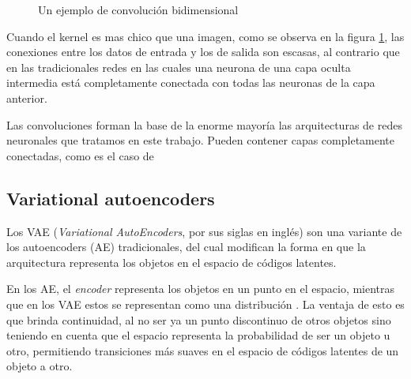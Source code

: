 \documentclass[spanish]{article}
\begin{document}
\begin{figure}[H]
\caption{Un ejemplo de convolución bidimensional \cite{goodfellow2016deep}}
\label{convolucion}
\end{figure}

Cuando el kernel es mas chico que una imagen, como se observa en la
figura \ref{convolucion}, las conexiones entre los datos de entrada
y los de salida son escasas, al contrario que en las tradicionales
redes en las cuales una neurona de una capa oculta intermedia está
completamente conectada con todas las neuronas de la capa anterior.

Las convoluciones forman la base de la enorme mayoría las arquitecturas
de redes neuronales que tratamos en este trabajo. Pueden contener
capas completamente conectadas, como es el caso de 


\clearpage

\subsection{Variational autoencoders}
Los VAE (\textit{Variational AutoEncoders}, por sus siglas en inglés)
son una variante de los autoencoders (AE) tradicionales, del cual
modifican la forma en que la arquitectura representa los objetos en
el espacio de códigos latentes.  

En los AE, el \textit{encoder} representa los objetos en un punto en
el espacio, mientras que en los VAE estos se representan como una
distribución \cite{Foster2019}. La ventaja de esto es que brinda
continuidad, al no ser ya un punto discontinuo de otros objetos sino
teniendo en cuenta que el espacio representa la probabilidad de ser un
objeto u otro, permitiendo transiciones más suaves en el espacio de
códigos latentes de un objeto a otro.
\end{document}
